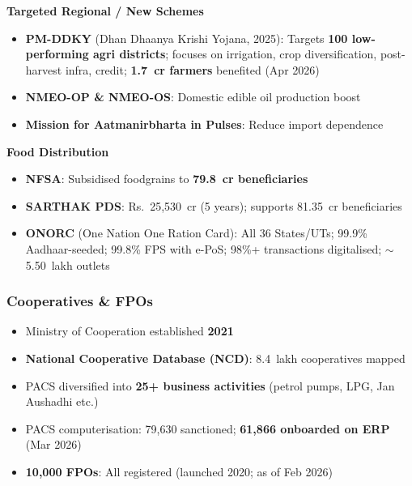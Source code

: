 \textbf{Targeted Regional / New Schemes}
\begin{itemize}
  \item \textbf{PM-DDKY} (Dhan Dhaanya Krishi Yojana, 2025): Targets \textbf{100 low-performing agri districts}; focuses on irrigation, crop diversification, post-harvest infra, credit; \textbf{1.7~cr farmers} benefited (Apr 2026)
  \item \textbf{NMEO-OP \& NMEO-OS}: Domestic edible oil production boost
  \item \textbf{Mission for Aatmanirbharta in Pulses}: Reduce import dependence
\end{itemize}

\textbf{Food Distribution}
\begin{itemize}
  \item \textbf{NFSA}: Subsidised foodgrains to \textbf{79.8~cr beneficiaries}
  \item \textbf{SARTHAK PDS}: Rs.~25,530~cr (5 years); supports 81.35~cr beneficiaries
  \item \textbf{ONORC} (One Nation One Ration Card): All 36 States/UTs; 99.9\% Aadhaar-seeded; 99.8\% FPS with e-PoS; 98\%+ transactions digitalised; $\sim$5.50~lakh outlets
\end{itemize}

\subsubsection*{Cooperatives \& FPOs}
\begin{itemize}
  \item Ministry of Cooperation established \textbf{2021}
  \item \textbf{National Cooperative Database (NCD)}: 8.4~lakh cooperatives mapped
  \item PACS diversified into \textbf{25+ business activities} (petrol pumps, LPG, Jan Aushadhi etc.)
  \item PACS computerisation: 79,630 sanctioned; \textbf{61,866 onboarded on ERP} (Mar 2026)
  \item \textbf{10,000 FPOs}: All registered (launched 2020; as of Feb 2026)
\end{itemize}


